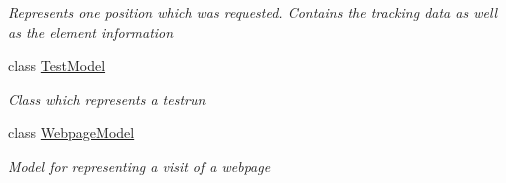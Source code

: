 \begin{DoxyCompactItemize}
\begin{DoxyCompactList}\small\item\em Represents one position which was requested. Contains the tracking data as well as the element information \end{DoxyCompactList}\item 
class \hyperlink{class_web_analyzer_1_1_models_1_1_data_model_1_1_test_model}{Test\+Model}
\begin{DoxyCompactList}\small\item\em Class which represents a testrun \end{DoxyCompactList}\item 
class \hyperlink{class_web_analyzer_1_1_models_1_1_data_model_1_1_webpage_model}{Webpage\+Model}
\begin{DoxyCompactList}\small\item\em Model for representing a visit of a webpage \end{DoxyCompactList}\end{DoxyCompactItemize}
